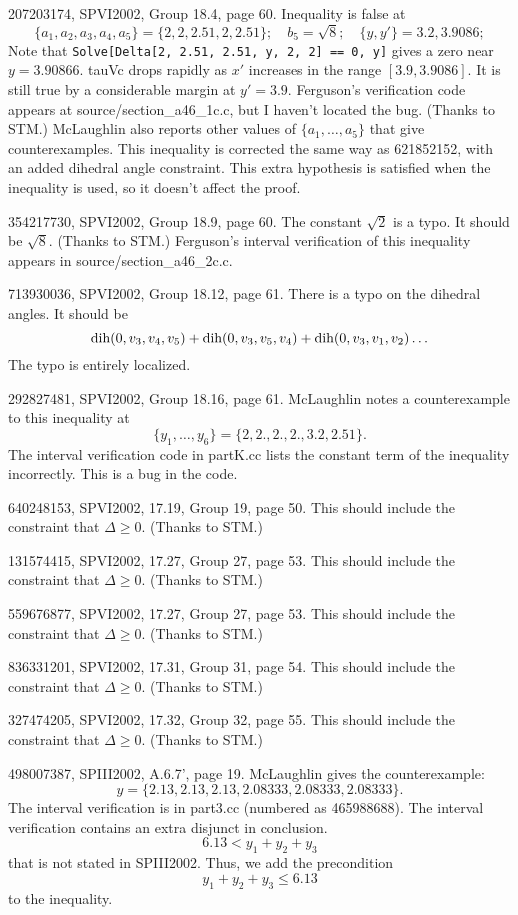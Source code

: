 \documentclass[11pt]{amsart}
\def\op#1{{\text{#1}}}
\def\text{\hbox}
\begin{document}
207203174, SPVI2002, Group 18.4, page 60. 
Inequality is false at 
  $$\{a_1,a_2,a_3,a_4,a_5\}=\{2,2,2.51,2,2.51\}; \quad
   b_5=\sqrt{8};\quad  \{y,y'\}={3.2,3.9086};
   $$
   Note that 
   {\tt Solve[Delta[2, 2.51, 2.51, y, 2, 2] == 0, y]} gives a zero
   near $y = 3.90866$.
   tauVc drops rapidly as $x'$ increases in the range $[3.9,3.9086]$.
   It is still true by a considerable margin at $y'=3.9$.
   Ferguson's verification code appears at 
   source/section\_a46\_1c.c, but I haven't
   located the bug. (Thanks to STM.)
   McLaughlin also reports other values of $\{a_1,\ldots,a_5\}$ that give
   counterexamples.
   This inequality is corrected the same way
   as 621852152, with an added dihedral angle
   constraint.  This extra hypothesis is satisfied
   when the inequality is used, so it doesn't affect
   the proof.

354217730, SPVI2002, Group 18.9, page 60.
The constant $\sqrt2$ is a typo.  It should be $\sqrt8$.  (Thanks to STM.)
Ferguson's interval verification of this inequality appears
in source/section\_a46\_2c.c.

713930036, SPVI2002, Group 18.12, page 61.
There is a typo on the dihedral angles.  It should be
  $$
  \op{dih}(0,v_3,v_4,v_5)+\op{dih}(0,v_3,v_5,v_4)+\op{dih}(0,v_3,v_1,v_2)
  \ldots
  $$
The typo is entirely localized.

292827481, SPVI2002, Group 18.16, page 61.
McLaughlin notes a counterexample to this inequality at
$$
\{y_1,\ldots,y_6\} = \{2, 2., 2., 2., 3.2, 2.51\}.
$$
The interval verification code in partK.cc lists the constant term of
the inequality incorrectly.  This is a bug in the code.

640248153, SPVI2002, 17.19, Group 19, page 50.
This should include the constraint that $\Delta\ge0$. (Thanks to STM.)

131574415, SPVI2002, 17.27, Group 27, page 53.
This should include the constraint that $\Delta\ge0$. (Thanks to STM.)

559676877,  SPVI2002, 17.27, Group 27, page 53.
This should include the constraint that $\Delta\ge0$. (Thanks to STM.)

836331201, SPVI2002, 17.31, Group 31, page 54.
This should include the constraint that $\Delta\ge0$. (Thanks to STM.)

327474205, SPVI2002, 17.32, Group 32, page 55.
This should include the constraint that $\Delta\ge0$. (Thanks to STM.)

498007387, SPIII2002, A.6.7', page 19.
McLaughlin gives the counterexample:
$$
 y = \{2.13,2.13,2.13,2.08333,2.08333,2.08333\}.
$$
The interval verification is in part3.cc (numbered as 465988688).
The interval verification contains an extra disjunct in conclusion.
$$6.13 < y_1 +  y_2 + y_3$$
that is not stated in SPIII2002. 
Thus, we add the precondition
$$y_1 + y_2 + y_3 \le 6.13$$
to the inequality.
\end{document}
